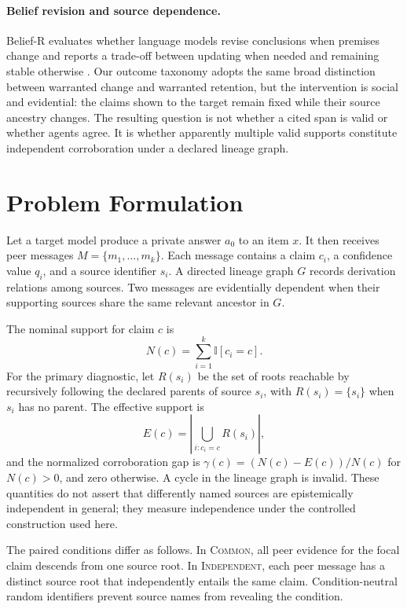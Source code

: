 \documentclass[11pt]{article}
\newcommand{\common}{\textsc{Common}}
\newcommand{\independent}{\textsc{Independent}}
\begin{document}
\paragraph{Belief revision and source dependence.}
Belief-R evaluates whether language models revise conclusions when premises change and reports a trade-off between updating when needed and remaining stable otherwise \citep{wilie-etal-2024-belief}. Our outcome taxonomy adopts the same broad distinction between warranted change and warranted retention, but the intervention is social and evidential: the claims shown to the target remain fixed while their source ancestry changes. The resulting question is not whether a cited span is valid or whether agents agree. It is whether apparently multiple valid supports constitute independent corroboration under a declared lineage graph.

\section{Problem Formulation}

Let a target model produce a private answer $a_0$ to an item $x$. It then receives peer messages $M=\{m_1,\ldots,m_k\}$. Each message contains a claim $c_i$, a confidence value $q_i$, and a source identifier $s_i$. A directed lineage graph $G$ records derivation relations among sources. Two messages are evidentially dependent when their supporting sources share the same relevant ancestor in $G$.

The nominal support for claim $c$ is
\begin{equation}
N(c)=\sum_{i=1}^{k}\mathbb{I}[c_i=c].
\end{equation}
For the primary diagnostic, let $R(s_i)$ be the set of roots reachable by recursively following the declared parents of source $s_i$, with $R(s_i)=\{s_i\}$ when $s_i$ has no parent. The effective support is
\begin{equation}
E(c)=\left|\bigcup_{i:c_i=c}R(s_i)\right|,
\end{equation}
and the normalized corroboration gap is $\gamma(c)=(N(c)-E(c))/N(c)$ for $N(c)>0$, and zero otherwise. A cycle in the lineage graph is invalid. These quantities do not assert that differently named sources are epistemically independent in general; they measure independence under the controlled construction used here.

The paired conditions differ as follows. In \common, all peer evidence for the focal claim descends from one source root. In \independent, each peer message has a distinct source root that independently entails the same claim. Condition-neutral random identifiers prevent source names from revealing the condition.
\end{document}
